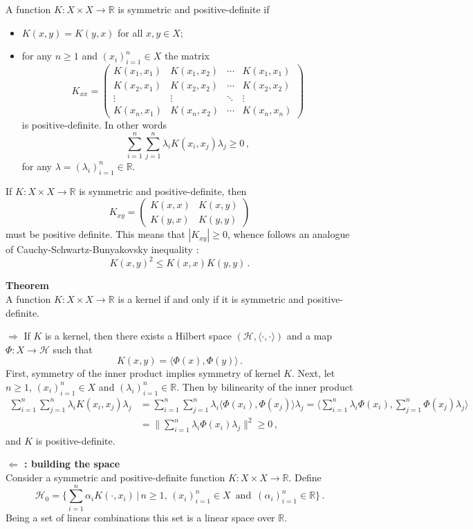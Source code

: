\documentclass[a4paper]{article}
\newcommand{\Real}{\mathbb{R}}
\newcommand{\Hcal}{\mathcal{H}}
\begin{document}
A function $K : X\times X \to \Real$ is symmetric and positive-definite if \begin{itemize}
	\item $K(x,y) = K(y,x)$ for all $x,y\in X$;
	\item for any $n\geq1$ and $(x_i)_{i=1}^n\in X$ the matrix
	\[ K_{xx} = \begin{pmatrix}
			K(x_1,x_1) & K(x_1,x_2) & \cdots & K(x_1,x_1) \\
			K(x_2,x_1) & K(x_2,x_2) & \cdots & K(x_2,x_2) \\
			\vdots & \vdots & \ddots & \vdots \\
			K(x_n,x_1) & K(x_n,x_2) & \cdots & K(x_n,x_n)
		\end{pmatrix} \]
	is positive-definite. In other words
	\[ \sum_{i=1}^n \sum_{j=1}^n \lambda_i K(x_i,x_j)\lambda_j \geq 0\,, \]
	for any $\lambda = (\lambda_i)_{i=1}^n \in \Real$.
\end{itemize}
If $K : X\times X \to \Real$ is symmetric and positive-definite, then
\[ K_{xy} = \begin{pmatrix}
	K(x,x) & K(x,y)\\
	K(y,x) & K(y,y)
\end{pmatrix} \]
must be positive definite. This means that $|K_{xy}|\geq 0$, whence follows an
analogue of Cauchy-Schwartz-Bunyakovsky inequality :
\[ K(x,y)^2 \leq K(x,x) K(y,y)\,. \]

\noindent\textbf{Theorem}\hfill\\
A function $K : X\times X \to \Real$ is a kernel if and only if it is symmetric and
positive-definite.

\noindent\textbf{$\Rightarrow$} If $K$ is a kernel, then there exists a Hilbert space
$(\Hcal, \langle\cdot,\cdot\rangle)$ and a map $\Phi:X\to \Hcal$ such that
\[ K(x,y) = \langle \Phi(x), \Phi(y)\rangle\,. \]
First, symmetry of the inner product implies symmetry of kernel $K$. Next, let 
$n\geq1$, $(x_i)_{i=1}^n\in X$ and $(\lambda_i)_{i=1}^n \in \Real$. Then by bilinearity
of the inner product
\begin{align*}
	\sum_{i=1}^n \sum_{j=1}^n \lambda_i K(x_i,x_j)\lambda_j
	&= \sum_{i=1}^n \sum_{j=1}^n \lambda_i \langle \Phi(x_i), \Phi(x_j)\rangle \lambda_j
	= \langle \sum_{i=1}^n \lambda_i \Phi(x_i), \sum_{j=1}^n \Phi(x_j) \lambda_j\rangle\\
	&= \| \sum_{i=1}^n \lambda_i \Phi(x_i) \lambda_j \|^2
	\geq 0\,,
\end{align*}
and $K$ is positive-definite.

\noindent \textbf{ $\Leftarrow$ : building the space}\hfill\\
Consider a symmetric and positive-definite function $K : X \times X \to \Real$.
Define
\[
\Hcal_0 = \bigl\{ \sum_{i=1}^n \alpha_i K(\cdot, x_i)\,\big|\,
n\geq 1,\, (x_i)_{i=1}^n\in X\, \text{ and }\, (\alpha_i)_{i=1}^n\in \Real \bigr\}\,.
\]
Being a set of linear combinations this set is a linear space over $\Real$.
\end{document}

